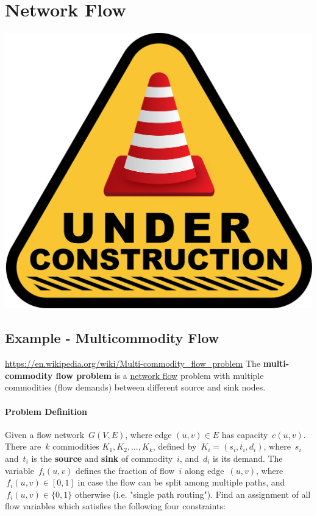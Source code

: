 \section{Network Flow}
\begin{center}
\href{https://pixabay.com/illustrations/under-construction-construction-sign-2408060/}{\includegraphics[scale = 0.05]{optimization/figures/under-construction-2408060_1280}}
\end{center}
\subsection{Example - Multicommodity Flow}

\url{https://en.wikipedia.org/wiki/Multi-commodity_flow_problem}
The \textbf{multi-commodity flow problem} is a
\href{flow_network}{network flow} problem with multiple commodities
(flow demands) between different source and sink nodes.

\paragraph{Problem Definition}

Given a flow network \(\,G(V,E)\), where edge \((u,v) \in E\) has
capacity \(\,c(u,v)\). There are \(\,k\) commodities
\(K_1,K_2,\dots,K_k\), defined by \(\,K_i=(s_i,t_i,d_i)\), where
\(\,s_i\) and \(\,t_i\) is the \textbf{source} and \textbf{sink} of
commodity \(\,i\), and \(\,d_i\) is its demand. The variable
\(\,f_i(u,v)\) defines the fraction of flow \(\,i\) along edge
\(\,(u,v)\), where \(\,f_i(u,v) \in [0,1]\) in case the flow can be
split among multiple paths, and \(\,f_i(u,v) \in \{0,1\}\) otherwise
(i.e. "single path routing"). Find an assignment of all flow variables
which satisfies the following four constraints:

